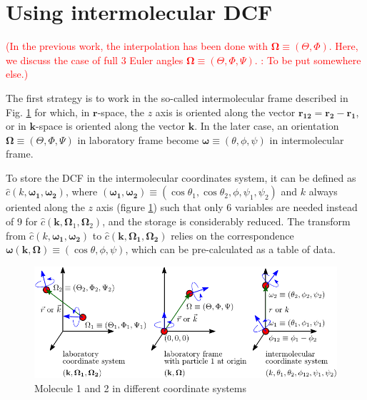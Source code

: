 \section{Using intermolecular DCF}

\textcolor{red}{(In the previous work, the interpolation has been
done with $\mathbf{\Omega}\equiv(\Theta,\Phi)$. Here, we discuss
the case of full 3 Euler angles $\mathbf{\Omega}\equiv(\Theta,\Phi,\Psi)$.
: To be put somewhere else.)}

The first strategy is to work in the so-called intermolecular frame
described in Fig. \ref{fig:coordinate_systems} for which, in $\mathbf{r}$-space,
the $z$ axis is oriented along the vector $\mathbf{r_{12}}=\mathbf{r_{2}}-\mathbf{r_{1}}$,
or in $\mathbf{k}$-space is oriented along the vector $\mathbf{k}$.
In the later case, an orientation $\mathbf{\Omega}\equiv(\Theta,\Phi,\Psi)$
in laboratory frame become $\boldsymbol{\omega}\equiv(\theta,\phi,\psi)$
in intermolecular frame. 

To store the DCF in the intermolecular coordinates system, it can
be defined as $\hat{c}(k,\boldsymbol{\omega_{1}},\boldsymbol{\omega_{2}})$,
where $(\boldsymbol{\omega_{1}},\boldsymbol{\omega_{2}})\equiv(\cos\theta_{1},\cos\theta_{2},\phi,\psi_{1},\psi_{2})$
and $k$ always oriented along the $z$ axis (figure \ref{fig:coordinate_systems})
such that only 6 variables are needed instead of 9 for $\hat{c}(\mathbf{k},\mathbf{\Omega}_{1},\mathbf{\Omega}_{2})$,
and the storage is considerably reduced. The transform from $\hat{c}(k,\boldsymbol{\omega_{1}},\boldsymbol{\omega_{2}})$
to $\hat{c}(\mathbf{k},\mathbf{\Omega_{1}},\mathbf{\Omega_{2}})$
relies on the correspondence $\boldsymbol{\omega}(\mathbf{k},\mathbf{\Omega})\equiv(\cos\theta,\phi,\psi)$,
which can be pre-calculated as a table of data.

%
\begin{figure}[h]
\begin{centering}
\includegraphics{_figure/coordinate_system}
\par\end{centering}

\caption{%
Molecule 1 and 2 in different coordinate systems\foreignlanguage{english}{\label{fig:coordinate_systems}}%
}
\end{figure}


